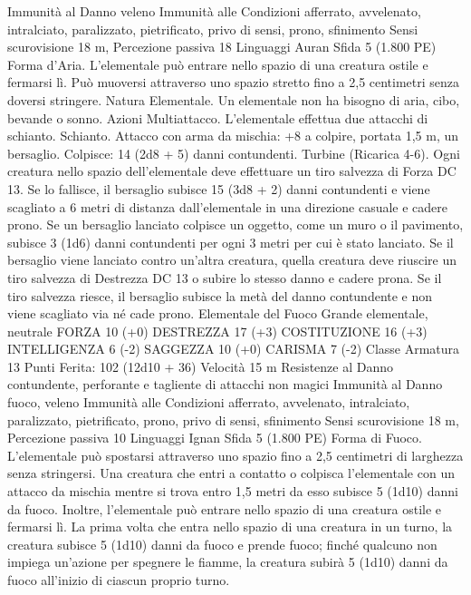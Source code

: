 \begin{multicols}{2}
Immunità al Danno veleno
Immunità alle Condizioni afferrato, avvelenato, intralciato,
paralizzato, pietrificato, privo di sensi, prono, sfinimento
Sensi scurovisione 18 m, Percezione passiva 18
Linguaggi Auran
Sfida 5 (1.800 PE)
Forma d’Aria. L’elementale può entrare nello spazio di una
creatura ostile e fermarsi lì. Può muoversi attraverso uno spazio
stretto fino a 2,5 centimetri senza doversi stringere.
Natura Elementale. Un elementale non ha bisogno di aria, cibo,
bevande o sonno.
Azioni
Multiattacco. L’elementale effettua due attacchi di schianto.
Schianto. Attacco con arma da mischia: +8 a colpire, portata 1,5
m, un bersaglio.
Colpisce: 14 (2d8 + 5) danni contundenti.
Turbine (Ricarica 4-6). Ogni creatura nello spazio
dell’elementale deve effettuare un tiro salvezza di Forza DC 13.
Se lo fallisce, il bersaglio subisce 15 (3d8 + 2) danni contundenti
e viene scagliato a 6 metri di distanza dall’elementale in una
direzione casuale e cadere prono. Se un bersaglio lanciato
colpisce un oggetto, come un muro o il pavimento, subisce 3
(1d6) danni contundenti per ogni 3 metri per cui è stato lanciato.
Se il bersaglio viene lanciato contro un’altra creatura, quella
creatura deve riuscire un tiro salvezza di Destrezza DC 13 o
subire lo stesso danno e cadere prona.
Se il tiro salvezza riesce, il bersaglio subisce la metà del danno
contundente e non viene scagliato via né cade prono.
Elementale del Fuoco
Grande elementale, neutrale
FORZA 10 (+0)
DESTREZZA 17 (+3)
COSTITUZIONE 16 (+3)
INTELLIGENZA 6 (-2)
SAGGEZZA 10 (+0)
CARISMA 7 (-2)
Classe Armatura 13
\hspace*{0pt}\hfill{Punti Ferita}: 102 (12d10 + 36)
Velocità 15 m
Resistenze al Danno contundente, perforante e tagliente di
attacchi non magici
Immunità al Danno fuoco, veleno
Immunità alle Condizioni afferrato, avvelenato, intralciato,
paralizzato, pietrificato, prono, privo di sensi, sfinimento
Sensi scurovisione 18 m, Percezione passiva 10
Linguaggi Ignan
Sfida 5 (1.800 PE)
Forma di Fuoco. L’elementale può spostarsi attraverso uno
spazio fino a 2,5 centimetri di larghezza senza stringersi. Una
creatura che entri a contatto o colpisca l’elementale con un
attacco da mischia mentre si trova entro 1,5 metri da esso subisce
5 (1d10) danni da fuoco. Inoltre, l’elementale può entrare nello
spazio di una creatura ostile e fermarsi lì. La prima volta che
entra nello spazio di una creatura in un turno, la creatura subisce
5 (1d10) danni da fuoco e prende fuoco; finché qualcuno non
impiega un’azione per spegnere le fiamme, la creatura subirà 5
(1d10) danni da fuoco all’inizio di ciascun proprio turno.

\end{multicols}
